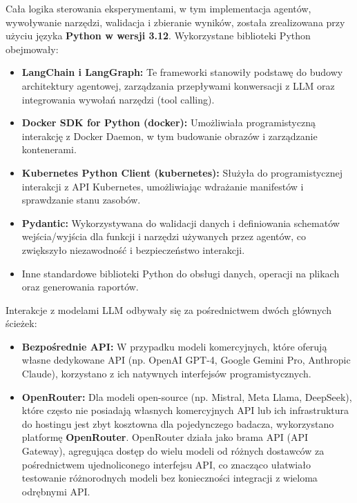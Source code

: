 Cała logika sterowania eksperymentami, w tym implementacja agentów, wywoływanie narzędzi, walidacja i zbieranie wyników, została zrealizowana przy użyciu języka \textbf{Python w wersji 3.12}. Wykorzystane biblioteki Python obejmowały:
\begin{itemize}
	\item \textbf{LangChain i LangGraph:} \cite{langchain} \cite{langgraph} Te frameworki stanowiły podstawę do budowy architektury agentowej, zarządzania przepływami konwersacji z LLM oraz integrowania wywołań narzędzi (tool calling).
	\item \textbf{Docker SDK for Python (docker):} \cite{docker_sdk_python} Umożliwiała programistyczną interakcję z Docker Daemon, w tym budowanie obrazów i zarządzanie kontenerami.
	\item \textbf{Kubernetes Python Client (kubernetes):} \cite{kubernetes_sdk_python} Służyła do programistycznej interakcji z API Kubernetes, umożliwiając wdrażanie manifestów i sprawdzanie stanu zasobów.
	\item \textbf{Pydantic:} \cite{pydantic} Wykorzystywana do walidacji danych i definiowania schematów wejścia/wyjścia dla funkcji i narzędzi używanych przez agentów, co zwiększyło niezawodność i bezpieczeństwo interakcji.
	\item Inne standardowe biblioteki Python do obsługi danych, operacji na plikach oraz generowania raportów.
\end{itemize}

Interakcje z modelami LLM odbywały się za pośrednictwem dwóch głównych ścieżek:
\begin{itemize}
	\item \textbf{Bezpośrednie API:} W przypadku modeli komercyjnych, które oferują własne dedykowane API (np. OpenAI GPT-4, Google Gemini Pro, Anthropic Claude), korzystano z ich natywnych interfejsów programistycznych.
	\item \textbf{OpenRouter:} Dla modeli open-source (np. Mistral, Meta Llama, DeepSeek), które często nie posiadają własnych komercyjnych API lub ich infrastruktura do hostingu jest zbyt kosztowna dla pojedynczego badacza, wykorzystano platformę \textbf{OpenRouter}. OpenRouter działa jako brama API (API Gateway), agregująca dostęp do wielu modeli od różnych dostawców za pośrednictwem ujednoliconego interfejsu API, co znacząco ułatwiało testowanie różnorodnych modeli bez konieczności integracji z wieloma odrębnymi API.
\end{itemize}

